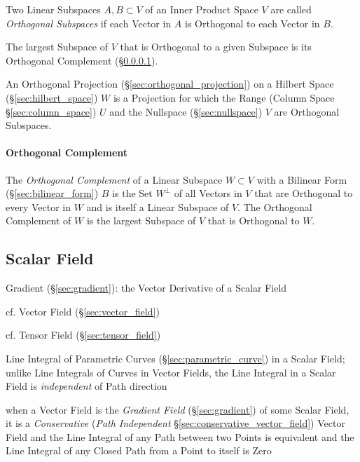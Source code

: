 Two Linear Subspaces $A, B \subset V$ of an Inner Product Space $V$ are called
\emph{Orthogonal Subspaces} if each Vector in $A$ is Orthogonal to each Vector
in $B$.

The largest Subspace of $V$ that is Orthogonal to a given Subspace is its
Orthogonal Complement (\S\ref{sec:orthogonal_complement}).

An Orthogonal Projection (\S\ref{sec:orthogonal_projection}) on a Hilbert Space
(\S\ref{sec:hilbert_space}) $W$ is a Projection for which the Range (Column
Space \S\ref{sec:column_space}) $U$ and the Nullspace (\S\ref{sec:nullspace})
$V$ are Orthogonal Subspaces.



\paragraph{Orthogonal Complement}\label{sec:orthogonal_complement}\hfill

The \emph{Orthogonal Complement} of a Linear Subspace $W \subset V$ with a
Bilinear Form (\S\ref{sec:bilinear_form}) $B$ is the Set $W^\bot$ of all
Vectors in $V$ that are Orthogonal to every Vector in $W$ and is itself a
Linear Subspace of $V$. The Orthogonal Complement of $W$ is the largest
Subspace of $V$ that is Orthogonal to $W$.



\subsection{Scalar Field}\label{sec:scalar_field}


Gradient (\S\ref{sec:gradient}): the Vector Derivative of a Scalar Field

cf. Vector Field (\S\ref{sec:vector_field})

cf. Tensor Field (\S\ref{sec:tensor_field})

Line Integral of Parametric Curves (\S\ref{sec:parametric_curve}) in a Scalar
Field; unlike Line Integrals of Curves in Vector Fields, the Line Integral in a
Scalar Field is \emph{independent} of Path direction

when a Vector Field is the \emph{Gradient Field} (\S\ref{sec:gradient}) of some
Scalar Field, it is a \emph{Conservative} (\emph{Path Independent}
\S\ref{sec:conservative_vector_field}) Vector Field and the Line Integral of
any Path between two Points is equivalent and the Line Integral of any Closed
Path from a Point to itself is Zero



